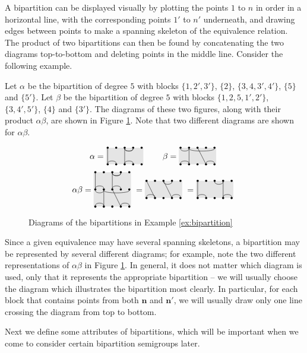A bipartition can be displayed visually by plotting the points $1$ to $n$ in
order in a horizontal line, with the corresponding points $1'$ to $n'$
underneath, and drawing edges between points to make a spanning skeleton of the
equivalence relation.  The product of two bipartitions can then be found by
concatenating the two diagrams top-to-bottom and deleting points in the middle
line.  Consider the following example.

\begin{example}
  \label{ex:bipartition}
  Let $\alpha$ be the bipartition of degree $5$ with blocks $\{1, 2', 3'\}$,
  $\{2\}$, $\{3, 4, 3', 4'\}$, $\{5\}$ and $\{5'\}$.  Let $\beta$ be the
  bipartition of degree $5$ with blocks $\{1, 2, 5, 1', 2'\}$, $\{3, 4', 5'\}$,
  $\{4\}$ and $\{3'\}$.  The diagrams of these two figures, along with their
  product $\alpha \beta$, are shown in Figure \ref{fig:bipartition-example}.
  Note that two different diagrams are shown for $\alpha \beta$.
  \begin{figure}[h]
    \centering
    $$\alpha = \bipartdiag{\tv11\bc12 \tc34 \tv33\tc34\bc34} \qquad
    \beta = \bipartdiag{\tc12\tc25\tv22\bc12 \tv34\bc45}$$
    $$\alpha \beta = \doublebipartdiag{\utv11\ubc12 \utc34 \utv33\utc34\ubc34
      \tc12\tc25\tv22\bc12 \tv34\bc45}
    = \bipartdiag{\tv12\bc12 \tc34\tv34\bc45}
    = \bipartdiag{\tv11\bc12 \tc34\tv44\bc45}$$
    \caption{Diagrams of the bipartitions in Example \ref{ex:bipartition}}
    \label{fig:bipartition-example}
  \end{figure}
\end{example}

Since a given equivalence may have several spanning skeletons, a bipartition may
be represented by several different diagrams; for example, note the two
different representations of $\alpha \beta$ in Figure
\ref{fig:bipartition-example}.  In general, it does not matter which diagram is
used, only that it represents the appropriate bipartition -- we will usually
choose the diagram which illustrates the bipartition most clearly.  In
particular, for each block that contains points from both $\mathbf{n}$ and
$\mathbf{n}'$, we will usually draw only one line crossing the diagram from top
to bottom.

Next we define some attributes of bipartitions, which will be important when we
come to consider certain bipartition semigroups later.

